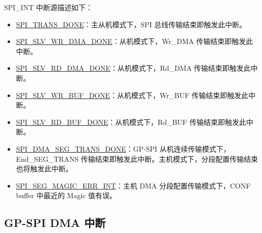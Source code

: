 \documentclass[main\_\_CN.tex]{subfiles}
\begin{document}
SPI\_INT 中断源描述如下：
\begin{itemize}
\item \label{int:SPITRANSDONEINT}\hyperref[fielddesc:SPITRANSDONE]{SPI\_TRANS\_DONE}：主从机模式下，SPI 总线传输结束即触发此中断。
\item \label{int:SPISLVWRSTAINT}\hyperref[fielddesc:SPISLVWRDMADONE]{SPI\_SLV\_WR\_DMA\_DONE}：从机模式下，Wr\_DMA 传输结束即触发此中断。
\item \label{int:SPISLVRDSTAINT}\hyperref[fielddesc:SPISLVRDDMADONE]{SPI\_SLV\_RD\_DMA\_DONE}：从机模式下，Rd\_DMA 传输结束即触发此中断。
\item \label{int:SPISLVWRBUFINT}\hyperref[fielddesc:SPISLVWRBUFDONE]{SPI\_SLV\_WR\_BUF\_DONE}：从机模式下，Wr\_BUF 传输结束即触发此中断。
\item \label{int:SPISLVRDBUFINT}\hyperref[fielddesc:SPISLVRDBUFDONE]{SPI\_SLV\_RD\_BUF\_DONE}：从机模式下，Rd\_BUF 传输结束即触发此中断。
\item \label{int:SPISEGTRANSINT}\hyperref[fielddesc:SPIDMASEGTRANSDONE]{SPI\_DMA\_SEG\_TRANS\_DONE}：GP-SPI 从机连续传输模式下，End\_SEG\_TRANS 传输结束即触发此中断。主机模式下，分段配置传输结束也将触发此中断。
\item \hyperref[fielddesc:SPISEGMAGICERR]{SPI\_SEG\_MAGIC\_ERR\_INT}：主机 DMA 分段配置传输模式下，CONF buffer 中最近的 Magic 值有误。
\end{itemize}

\subsection{GP-SPI DMA 中断} \label{Section:SPI_DMA_INT}
\end{document}
